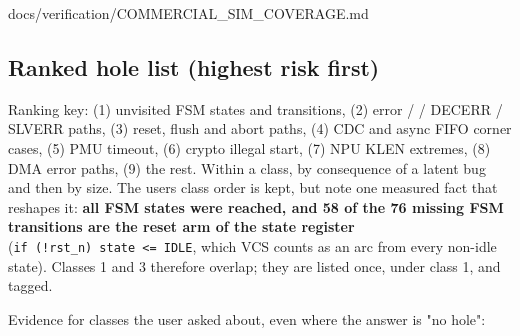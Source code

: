 \begin{relocated}{docs/verification/COMMERCIAL_SIM_COVERAGE.md}
\begin{landscape}
\end{landscape}

\subsection{Ranked hole list (highest risk first)}\label{tm:flow:commercial-sim-coverage:3-ranked-hole-list-highest-risk-first}

Ranking key: (1) unvisited FSM states and transitions, (2) error /
 / DECERR / SLVERR paths, (3) reset, flush and abort
paths, (4) CDC and async FIFO corner cases, (5) PMU timeout, (6) crypto
illegal start, (7) NPU KLEN extremes, (8) DMA error paths, (9) the rest.
Within a class, by consequence of a latent bug and then by size. The
user\textquotesingle s class order is kept, but note one measured fact
that reshapes it: \textbf{all FSM states were reached, and 58 of the 76
missing FSM transitions are the reset arm of the state register}
(\texttt{if\ (!rst\_\allowbreak{}n)\ state\ <=\allowbreak{}\ IDLE},
which VCS counts as an arc from every non-idle state). Classes 1 and 3
therefore overlap; they are listed once, under class 1, and tagged.

Evidence for classes the user asked about, even where the answer is "no
hole":


\end{relocated}
